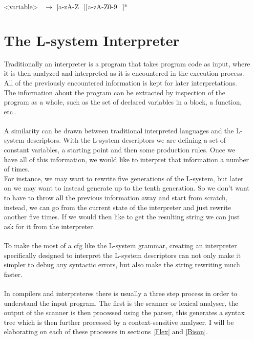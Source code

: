 \noindent
\textless variable\textgreater~ $\rightarrow$ [a-zA-Z\_][a-zA-Z0-9\_]* \\




\newpage

\section{The L-system Interpreter}

Traditionally an interpreter is a program that takes program code as input, where it is then analyzed and interpreted as it is encountered in the execution process. All of the previously encountered information is kept for later interpretations. The information about the program can be extracted by inspection of the program as a whole, such as the set of declared variables in a block, a function, etc \cite{wilhelm2010compiler}. \\
\\
A similarity can be drawn between traditional interpreted languages and the L-system descriptors. With the L-system descriptors we are defining a set of constant variables, a starting point and then some production rules. Once we have all of this information, we would like to interpret that information a number of times. \\
For instance, we may want to rewrite five generations of the L-system, but later on we may want to instead generate up to the tenth generation. So we don't want to have to throw all the previous information away and start from scratch, instead, we can go from the current state of the interpreter and just rewrite another five times. If we would then like to get the resulting string we can just ask for it from the interpreter. \\
\\
To make the most of a \acrshort{cfg} like the L-system grammar, creating an interpreter specifically designed to interpret the L-system descriptors can not only make it simpler to debug any syntactic errors, but also make the string rewriting much faster.\\
\\
In compilers and interpreteres there is usually a three step process in order to understand the input program. The first is the scanner or lexical analyser, the output of the scanner is then processed using the parser, this generates a syntax tree which is then further processed by a context-sensitive analyser. I will be elaborating on each of these processes in sections \ref{Flex} and \ref{Bison}. \\


